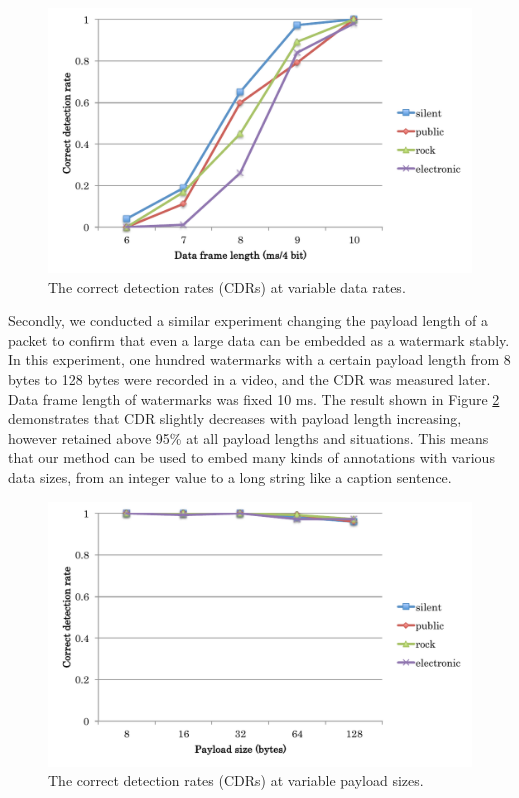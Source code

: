 \begin{figure}[htbp]
 \begin{center}
  \includegraphics[width=120mm]{evaluation_reliability_bitrate.pdf}
 \end{center}
 \caption{The correct detection rates (CDRs) at variable data rates.}
 \label{fig:eval_reli_btrt}
\end{figure}

Secondly, we conducted a similar experiment changing the payload length of a packet to confirm that even a large data can be embedded as a watermark stably.
In this experiment, one hundred watermarks with a certain payload length from 8 bytes to 128 bytes were recorded in a video, and the CDR was measured later.
Data frame length of watermarks was fixed 10 ms.
The result shown in Figure \ref{fig:eval_reli_pyld} demonstrates that CDR slightly decreases with payload length increasing, however retained above 95\% at all payload lengths and situations.
This means that our method can be used to embed many kinds of annotations with various data sizes, from an integer value to a long string like a caption sentence.

\begin{figure}[htbp]
 \begin{center}
  \includegraphics[width=120mm]{evaluation_reliability_payload.pdf}
 \end{center}
 \caption{The correct detection rates (CDRs) at variable payload sizes.}
 \label{fig:eval_reli_pyld}
\end{figure}

